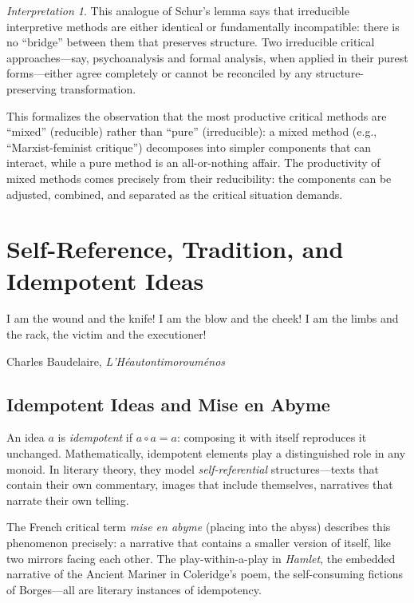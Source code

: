\documentclass[11pt,openany]{book}
\theoremstyle{definition}
\theoremstyle{plain}
\theoremstyle{remark}
\newtheorem{interpretation}[axiom]{Interpretation}
\newcommand{\compose}{\circ}                 %
\begin{document}
\begin{interpretation}
This analogue of Schur's lemma says that irreducible interpretive methods are either identical or fundamentally incompatible: there is no ``bridge'' between them that preserves structure. Two irreducible critical approaches---say, psychoanalysis and formal analysis, when applied in their purest forms---either agree completely or cannot be reconciled by any structure-preserving transformation.

This formalizes the observation that the most productive critical methods are ``mixed'' (reducible) rather than ``pure'' (irreducible): a mixed method (e.g., ``Marxist-feminist critique'') decomposes into simpler components that can interact, while a pure method is an all-or-nothing affair. The productivity of mixed methods comes precisely from their reducibility: the components can be adjusted, combined, and separated as the critical situation demands.
\end{interpretation}

\chapter{Self-Reference, Tradition, and Idempotent Ideas}
\label{ch:self-reference}

\epigraph{I am the wound and the knife! I am the blow and the cheek! I am the limbs and the rack, the victim and the executioner!}{Charles Baudelaire, \textit{L'Héautontimorouménos}}

\section{Idempotent Ideas and Mise en Abyme}

An idea $a$ is \emph{idempotent} if $a \compose a = a$: composing it with itself reproduces it unchanged. Mathematically, idempotent elements play a distinguished role in any monoid. In literary theory, they model \emph{self-referential} structures---texts that contain their own commentary, images that include themselves, narratives that narrate their own telling.

The French critical term \emph{mise en abyme} (placing into the abyss) describes this phenomenon precisely: a narrative that contains a smaller version of itself, like two mirrors facing each other. The play-within-a-play in \textit{Hamlet}, the embedded narrative of the Ancient Mariner in Coleridge's poem, the self-consuming fictions of Borges---all are literary instances of idempotency.
\end{document}
